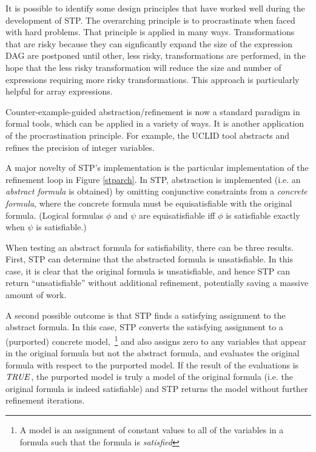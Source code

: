 It is possible to identify some design principles that have worked
well during the development of STP.  The overarching principle is to
procrastinate when faced with hard problems.  That principle is
applied in many ways. Transformations that are risky because they can
signficantly expand the size of the expression DAG are postponed until
other, less risky, transformations are performed, in the hope that the
less risky transformation will reduce the size and number of
expressions requiring more risky transformations.  This approach is
particularly helpful for array expressions.

Counter-example-guided abstraction/refinement is now a standard
paradigm in formal tools, which can be applied in a variety of ways.
It is another application of the procrastination principle.
For example, the UCLID tool abstracts and refines the precision of
integer variables.

A major novelty of STP's implementation is the particular
implementation of the refinement loop in Figure \ref{stparch}.  In
STP, abstraction is implemented (i.e. an {\it abstract formula} is
obtained) by omitting conjunctive constraints from a {\em concrete
formula}, where the concrete formula must be equisatisfiable with the
original formula. (Logical formulas $\phi$ and $\psi$ are
equisatisfiable iff $\phi$ is satisfiable exactly when $\psi$ is
satisfiable.)
  
When testing an abstract formula for satisfiability, there can be
three results.  First, STP can determine that the abstracted formula
is unsatisfiable.  In this case, it is clear that the original formula
is unsatisfiable, and hence STP can return ``unsatisfiable'' without
additional refinement, potentially saving a massive amount of work.

A second possible outcome is that STP finds a satisfying assignment to
the abstract formula.  In this case, STP converts the satisfying
assignment to a (purported) concrete model,~\footnote{A model is an
assignment of constant values to all of the variables in a formula
such that the formula is {\it satisfied}} and also assigns zero to any
variables that appear in the original formula but not the abstract
formula, and evaluates the original formula with respect to the
purported model.  If the result of the evaluations is ${\it TRUE}$, the
purported model is truly a model of the original formula (i.e. the
original formula is indeed satisfiable) and STP returns the model
without further refinement iterations.

